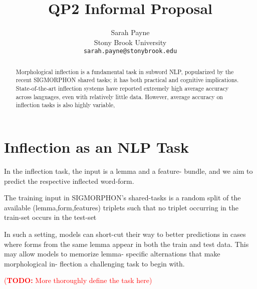 \documentclass[11pt]{article}
\title{QP2 Informal Proposal}
\author{Sarah Payne \\
  Stony Brook University \\
  \texttt{sarah.payne@stonybrook.edu} }
\newcommand{\todo}[1]{\textcolor{red}{(\textbf{TODO:} #1)}}
\begin{document}
\maketitle
\begin{abstract}
Morphological inflection is a fundamental task in subword NLP, popularized by the recent SIGMORPHON shared tasks; it has both practical and cognitive implications. 
State-of-the-art inflection systems have reported extremely high average accuracy across languages, even with relatively little data. 
However, average accuracy on inflection tasks is also highly variable, 



\end{abstract}



\section{Inflection as an NLP Task}
In the inflection task, the input is a lemma and a feature- bundle, and we aim to predict the respective inflected word-form.

The training input in SIGMORPHON’s shared-tasks is a random split of the available (lemma,form,features) triplets such that no triplet occurring in the train-set occurs in the test-set

\citet{goldman-etal-2022-un} In such a setting, models can short-cut their way to better predictions in cases where forms from the same lemma appear in both the train and test data. This may allow models to memorize lemma- specific alternations that make morphological in- flection a challenging task to begin with. 



\todo{More thoroughly define the task here}
\end{document}
